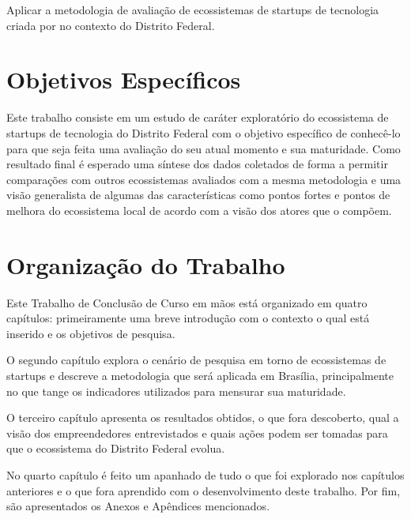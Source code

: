 Aplicar a metodologia de avaliação de ecossistemas de startups de tecnologia criada por  no contexto do Distrito Federal.

\section{Objetivos Específicos}
\label{section:objetivos_especificos}

Este trabalho consiste em um estudo de caráter exploratório do ecossistema de startups de tecnologia do Distrito Federal com o objetivo específico de conhecê-lo para que seja feita uma avaliação do seu atual momento e sua maturidade. Como resultado final é esperado uma síntese dos dados coletados de forma a permitir comparações com outros ecossistemas avaliados com a mesma metodologia e uma visão generalista de algumas das características como pontos fortes e pontos de melhora do ecossistema local de acordo com a visão dos atores que o compõem. 

\section{Organização do Trabalho}
\label{section:organizacao_do_trabalho}

Este Trabalho de Conclusão de Curso em mãos está organizado em quatro capítulos: primeiramente uma breve introdução com o contexto o qual está inserido e os objetivos de pesquisa.

O segundo capítulo explora o cenário de pesquisa em torno de ecossistemas de startups e descreve a metodologia que será aplicada em Brasília, principalmente no que tange os indicadores utilizados para mensurar sua maturidade.

O terceiro capítulo apresenta os resultados obtidos, o que fora descoberto, qual a visão dos empreendedores entrevistados e quais ações podem ser tomadas para que o ecossistema do Distrito Federal evolua.

No quarto capítulo é feito um apanhado de tudo o que foi explorado nos capítulos anteriores e o que fora aprendido com o desenvolvimento deste trabalho. Por fim, são apresentados os Anexos e Apêndices mencionados.
